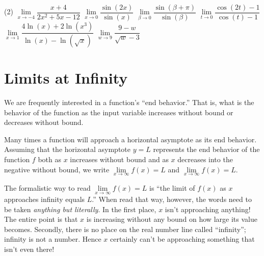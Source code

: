 \documentclass[12pt,]{book}
\theoremstyle{plain}
\theoremstyle{definition}
\theoremstyle{definition}
\theoremstyle{definition}
\theoremstyle{definition}
\theoremstyle{definition}
\numberwithin{equation}{section}
\newcommand{\fe}[2]{#1\mathopen{}\left(#2\right)\mathclose{}}
\begin{document}
\begin{exercisegroup}(2)
\exercise[2.]\hypertarget{exercise-73}{}\(\lim\limits_{x\to-4}\dfrac{x+4}{2x^2+5x-12}\)%
\exercise[3.]\hypertarget{exercise-74}{}\(\lim\limits_{x\to0}\dfrac{\fe{\sin}{2x}}{\fe{\sin}{x}}\)%
\exercise[4.]\hypertarget{exercise-75}{}\(\lim\limits_{\beta\to0}\dfrac{\fe{\sin}{\beta+\pi}}{\fe{\sin}{\beta}}\)%
\exercise[5.]\hypertarget{exercise-76}{}\(\lim\limits_{t\to0}\dfrac{\fe{\cos}{2t}-1}{\fe{\cos}{t}-1}\)%
\exercise[6.]\hypertarget{exercise-77}{}\(\lim\limits_{x\to1}\dfrac{4\fe{\ln}{x}+2\fe{\ln}{x^3}}{\fe{\ln}{x}-\fe{\ln}{\sqrt{x}}}\)%
\exercise[7.]\hypertarget{exercise-78}{}\(\lim\limits_{w\to9}\dfrac{9-w}{\sqrt{w}-3}\)%
\end{exercisegroup}
\par\smallskip\noindent
\typeout{************************************************}
\typeout{************************************************}
\section[{Limits at Infinity}]{Limits at Infinity}\label{section-limits-at-infinity}
We are frequently interested in a function's ``end behavior.'' That is, what is the behavior of the function as the input variable increases without bound or decreases without bound.%
\par
Many times a function will approach a horizontal asymptote as its end behavior. Assuming that the horizontal asymptote \(y=L\) represents the end behavior of the function \(f\) both as \(x\) increases without bound and as \(x\) decreases into the negative without bound, we write \(\lim\limits_{x\to\infty}\fe{f}{x}=L\) and \(\lim\limits_{x\to\infty}\fe{f}{x}=L\).%
\par
The formalistic way to read \(\lim\limits_{x\to\infty}\fe{f}{x}=L\) is ``the limit of \(\fe{f}{x}\) as \(x\) approaches infinity equals \(L\).'' When read that way, however, the words need to be taken \emph{anything but literally}. In the first place, \(x\) isn't approaching anything! The entire point is that \(x\) is increasing without any bound on how large its value becomes. Secondly, there is no place on the real number line called ``infinity''; infinity is not a number. Hence \(x\) certainly can't be approaching something that isn't even there!%
\typeout{************************************************}
\typeout{************************************************}
\end{document}
